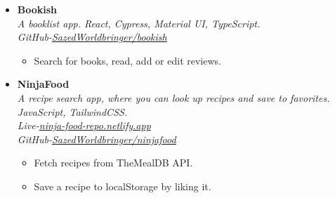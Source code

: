 \documentclass[11pt, oneside, a4paper, titlepage]{article}
\newcommand\experienceVSpace{\vspace{-0.1cm}}
\begin{document}
\begin{tcolorbox}
\begin{minipage}[t]{11cm}
\begin{tcolorbox}[grow to right by=0.75cm,colframe=white,colback=white]
\begin{itemize}
        \item
        {
          \textbf{Bookish} \\
          \textit{A booklist app. React, Cypress, Material UI, TypeScript.} \\
          \textit{GitHub-\href{https://github.com/SazedWorldbringer/bookish}{\underline{SazedWorldbringer/bookish}}} \\
          \vspace*{-0.7cm}
          \begin{itemize}
            \item Search for books, read, add or edit reviews.
          \end{itemize}
        }

        \item
        {
          \textbf{NinjaFood} \\
          \textit{A recipe search app, where you can look up recipes and save to favorites. JavaScript, TailwindCSS.} \\
          \textit{Live-\href{https://ninja-food-repo.netlify.app}{\underline{ninja-food-repo.netlify.app}} \\ GitHub-\href{https://github.com/SazedWorldbringer/ninjafood}{\underline{SazedWorldbringer/ninjafood}}} \\
          \vspace*{-0.7cm}
          \begin{itemize}
            \item Fetch recipes from TheMealDB API.
              \experienceVSpace
            \item Save a recipe to localStorage by liking it.
          \end{itemize}
        }
      \end{itemize}

\end{tcolorbox}
\end{minipage}
\end{tcolorbox}
\end{document}
